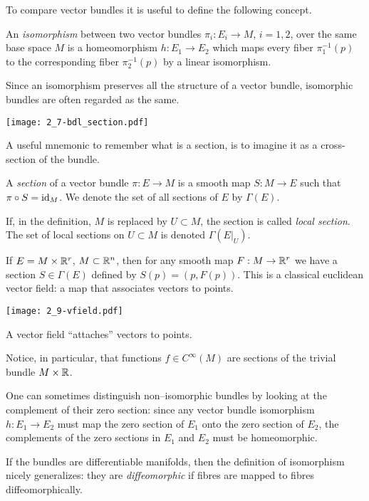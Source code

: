 To compare vector bundles it is useful to define the following concept.
\begin{definition}
  An \emph{isomorphism} between two vector bundles $\pi_i: E_i \to M$, $i=1,2$, over the same base space $M$ is a homeomorphism $h:E_1 \to E_2$ which maps every fiber $\pi_1^{-1}(p)$ to the corresponding fiber $\pi_2^{-1}(p)$ by a linear isomorphism.
\end{definition}

Since an isomorphism preserves all the structure of a vector bundle, isomorphic bundles are often regarded as the same.

\begin{marginfigure}[-30em]
  \texttt{[image: 2\_7-bdl\_section.pdf]}
  \caption{A useful mnemonic to remember what is a section, is to imagine it as a cross-section of the bundle.}
\end{marginfigure}

\begin{definition}
  A \emph{section} of a vector bundle $\pi:E \to M$ is a smooth map $S:M \to E$ such that $\pi\circ S = \operatorname{id}_M$. We denote the set of all sections of $E$ by $\Gamma(E)$.
  
  If, in the definition, $M$ is replaced by $U\subset M$, the section is called \emph{local section}. The set of local sections on $U\subset M$ is denoted $\Gamma(E|_U)$.
\end{definition}

\begin{example}
  If $E = M\times \mathbb{R}^r$, $M\subset\mathbb{R}^n$, then for any smooth map $F: M\to\mathbb{R}^r$ we have a section $S\in\Gamma(E)$ defined by $S(p) = (p, F(p))$. This is a classical euclidean vector field: a map that associates vectors to points.
  \begin{marginfigure}
    \texttt{[image: 2\_9-vfield.pdf]}
    \caption{A vector field ``attaches'' vectors to points.}
  \end{marginfigure}
  \noindent Notice, in particular, that functions $f\in C^\infty(M)$ are sections of the trivial bundle $M\times\mathbb{R}$.
\end{example}

One can sometimes distinguish non--isomorphic bundles by looking at the complement of their zero section: since any vector bundle isomorphism $h:E_1\to E_2$ must map the zero section of $E_1$ onto the zero section of $E_2$, the complements of the zero sections in $E_1$ and $E_2$ must be homeomorphic.

If the bundles are differentiable manifolds, then the definition of isomorphism nicely generalizes: they are \emph{diffeomorphic} if fibres are mapped to fibres diffeomorphically.

